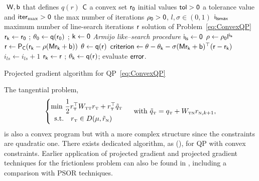 \begin{algorithm}
  \begin{algorithmic}
    {\sf
      \STATE $ $
      \REQUIRE $\sf W,b$ that defines $q(r)$
      \REQUIRE $\sf C$ a convex set
      \REQUIRE $\sf r_0$ initial values
      \REQUIRE $\sf tol >0$ a tolerance value and $\sf iter_{\max}  >0$ the max number of iterations
      \REQUIRE $\sf\rho_0>0$, $l,\sigma\in(0,1)$
      \REQUIRE $\sf i_{lsmax}$ maximum number of line-search iterations
      \ENSURE  $\sf r$ solution of Problem~\ref{eq:ConvexQP}
      \STATE $\sf r_{k} \leftarrow r_0 $ ; $\sf \theta_0  \leftarrow  q(r_0)$ ; $\sf k \leftarrow 0$
      \STATE \textit{Armijo like--search procedure}
      \STATE $\sf i_{ls}  \leftarrow 0$
      \STATE $\sf \rho \leftarrow \rho_0 l^{i_{ls}}$
      \STATE $\sf r \leftarrow  P_C(r_k - \rho (M r_k +b))$
      \STATE $\sf \theta \leftarrow  q(r)$
      \STATE $\sf criterion \leftarrow \theta - \theta_k - \sigma (Mr_k+b)^\top(r-r_k)$
      \STATE $i_{ls} \leftarrow i_{ls}+1$
      \ENDWHILE
      \STATE $\sf r_{k} \leftarrow r $ ; $\sf \theta_k \leftarrow  q(r)$;
      \STATE evaluate $\sf error$.
      \ENDWHILE
    }
  \end{algorithmic}
  \caption{Projected gradient algorithm for QP~\eqref{eq:ConvexQP}}
  \label{Algo:ConvexQP}
\end{algorithm}




The tangential problem,
\begin{equation}
  \label{eq:AO-4-bis}
  \begin{cases}
    \min\,  \Frac 1 2 r_\t^\top W _{\t\t} r_\t +  r_\t^\top \tilde q_\t \\
    \begin{array}{ll}
     \text{s.t.}  & r_\t \in D(\mu,\tilde r_{\n})
  \end{array}
\end{cases} \text{ with } \tilde q_\t = q_\t + W_{\t\n}r_{\n,k+1},
\end{equation}
is also a convex program but with a more complex structure since the constraints are quadratic one.
There exists dedicated algorithm, as (\cite{Dostal.Kozubek_MP2012}), for QP with convex constraints.
Earlier application of projected gradient and projected gradient techniques for the frictionless problem can also be found in \cite{Barbosa.ea1997}, including a comparison with PSOR techniques.

